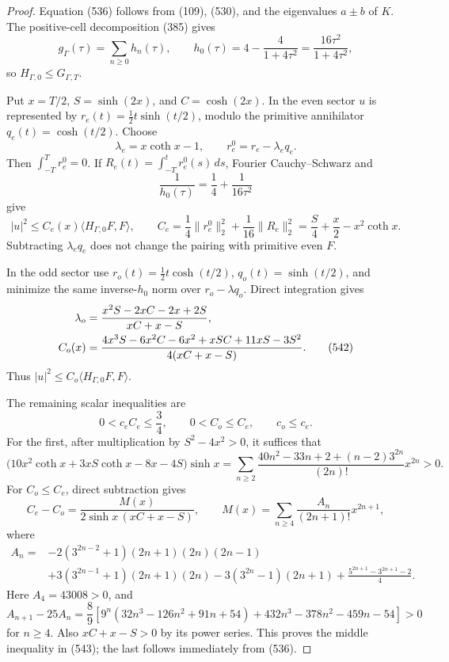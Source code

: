 \documentclass[11pt]{article}
\begin{document}
\begin{proof}
Equation (536) follows from (109), (530), and the eigenvalues \(a\pm b\)
of \(K\).  The positive-cell decomposition (385) gives
\[
 g_\Gamma(\tau)=\sum_{n\ge0}h_n(\tau),\qquad
 h_0(\tau)=4-\frac4{1+4\tau^2}
           =\frac{16\tau^2}{1+4\tau^2},
\]
so \(H_{\Gamma,0}\le G_{\Gamma,T}\).

Put \(x=T/2\), \(S=\sinh(2x)\), and \(C=\cosh(2x)\).  In the even sector
\(u\) is represented by
\(r_e(t)=\frac12t\sinh(t/2)\), modulo the primitive annihilator
\(q_e(t)=\cosh(t/2)\).  Choose
\begin{equation}
 \lambda_e=x\coth x-1,\qquad r_e^0=r_e-\lambda_eq_e.  \tag{540}
\end{equation}
Then \(\int_{-T}^Tr_e^0=0\).  If
\(R_e(t)=\int_{-T}^tr_e^0(s)\,ds\), Fourier
Cauchy--Schwarz and
\[
 \frac1{h_0(\tau)}=\frac14+\frac1{16\tau^2}
\]
give
\begin{equation}
 |u|^2\le C_e(x)\langle H_{\Gamma,0}F,F\rangle,\qquad
 C_e=\frac14\|r_e^0\|_2^2+\frac1{16}\|R_e\|_2^2
 =\frac S4+\frac x2-x^2\coth x.                      \tag{541}
\end{equation}
Subtracting \(\lambda_eq_e\) does not change the pairing with primitive
even \(F\).

In the odd sector use
\(r_o(t)=\frac12t\cosh(t/2)\), \(q_o(t)=\sinh(t/2)\), and minimize the
same inverse-\(h_0\) norm over \(r_o-\lambda q_o\).  Direct integration
gives
\begin{align}
 \lambda_o&=\frac{x^2S-2xC-2x+2S}{xC+x-S},\notag\\
 C_o(x)&=\frac{4x^3S-6x^2C-6x^2+xSC+11xS-3S^2}
               {4(xC+x-S)}.                          \tag{542}
\end{align}
Thus \(|u|^2\le C_o\langle H_{\Gamma,0}F,F\rangle\).

The remaining scalar inequalities are
\begin{equation}
 0<c_eC_e\le\frac34,\qquad
 0<C_o\le C_e,\qquad c_o\le c_e.                     \tag{543}
\end{equation}
For the first, after multiplication by \(S^2-4x^2>0\), it suffices that
\begin{equation}
 \bigl(10x^2\coth x+3xS\coth x-8x-4S\bigr)\sinh x
 =\sum_{n\ge2}
 \frac{40n^2-33n+2+(n-2)3^{2n}}{(2n)!}x^{2n}>0.      \tag{544}
\end{equation}
For \(C_o\le C_e\), direct subtraction gives
\[
 C_e-C_o=\frac{M(x)}{2\sinh x\,(xC+x-S)},\qquad
 M(x)=\sum_{n\ge4}\frac{A_n}{(2n+1)!}x^{2n+1},        \tag{545}
\]
where
\begin{align*}
 A_n={}&-2(3^{2n-2}+1)(2n+1)(2n)(2n-1)\\
 &+3(3^{2n-1}+1)(2n+1)(2n)
   -3(3^{2n}-1)(2n+1)
   +\frac{5^{2n+1}-3^{2n+1}-2}{4}.
\end{align*}
Here \(A_4=43008>0\), and
\[
 A_{n+1}-25A_n=\frac89\left[
 9^n(32n^3-126n^2+91n+54)
 +432n^3-378n^2-459n-54\right]>0
\]
for \(n\ge4\).  Also \(xC+x-S>0\) by its power series.  This proves the
middle inequality in (543); the last follows immediately from (536).


\end{proof}
\end{document}

